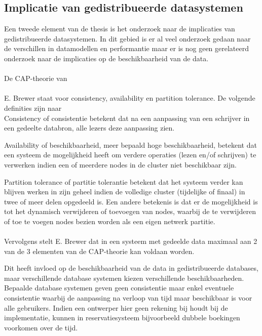 \documentclass{book}
\begin{document}
\subsection{Implicatie van gedistribueerde datasystemen}
Een tweede element van de thesis is het onderzoek naar de implicaties van gedistribueerde datasystemen. In dit gebied is er al veel onderzoek gedaan naar de verschillen in datamodellen en performantie maar er is nog geen gerelateerd onderzoek naar de implicaties op de beschikbaarheid van de data. 

\paragraph{}De CAP-theorie van  \\\\ E. Brewer staat voor consistency, availability en partition tolerance. De volgende definities zijn naar \\

Consistency of consistentie betekent dat na een aanpassing van een schrijver in een gedeelte databron, alle lezers deze aanpassing zien. 

Availability of beschikbaarheid, meer bepaald hoge beschikbaarheid, betekent dat een systeem de mogelijkheid heeft om verdere operaties (lezen en/of schrijven) te verwerken indien een of meerdere nodes in de cluster niet beschikbaar zijn.

Partition tolerance of partitie tolerantie betekent dat het systeem verder kan blijven werken in zijn geheel indien de volledige cluster (tijdelijke of finaal) in twee of meer delen opgedeeld is. Een andere betekenis is dat er de mogelijkheid is tot het dynamisch verwijderen of toevoegen van nodes, waarbij de te verwijderen of toe te voegen nodes bezien worden als een eigen netwerk partitie. 

\paragraph{} Vervolgens stelt E. Brewer dat in een systeem met gedeelde data maximaal aan 2 van de 3 elementen van de CAP-theorie kan voldaan worden. 

Dit heeft invloed op de beschikbaarheid van de data in gedistribueerde databases, maar verschillende database systemen kiezen verschillende beschikbaarheden. Bepaalde database systemen geven geen consistentie maar enkel eventuele consistentie waarbij de aanpassing na verloop van tijd maar beschikbaar is voor alle gebruikers. Indien een ontwerper hier geen rekening bij houdt bij de implementatie, kunnen in reservatiesysteem bijvoorbeeld dubbele boekingen voorkomen over de tijd. 
\end{document}
